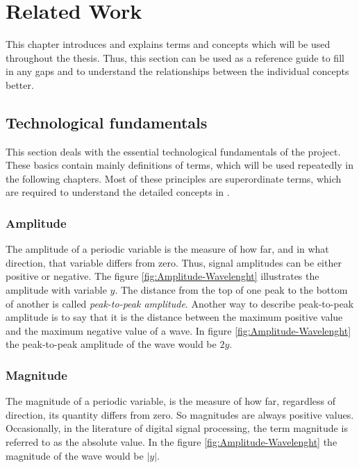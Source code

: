 \chapter{Related Work}
\label{ch:Related-Work}

This chapter introduces and explains terms and concepts which will be used throughout the thesis. Thus, this section can be used as a reference guide to fill in any gaps and to understand the relationships between the individual concepts better.

\section{Technological fundamentals}
\label{sec:Technological-Fundamentatls}

This section deals with the essential technological fundamentals of the project. These basics contain mainly definitions of terms, which will be used repeatedly in the following chapters. Most of these principles are superordinate terms, which are required to understand the detailed concepts in .

\subsection{Amplitude}
\label{sub:Amplitude}

The amplitude of a periodic variable is the measure of how far, and in what direction, that variable differs from zero. Thus, signal amplitudes can be either positive or negative. The figure \ref{fig:Amplitude-Wavelenght} illustrates the amplitude with variable $y$. 
\newline
\newline
The distance from the top of one peak to the bottom of another is called \textit{peak-to-peak amplitude}. Another way to describe peak-to-peak amplitude is to say that it is the distance between the maximum positive value and the maximum negative value of a wave. In figure \ref{fig:Amplitude-Wavelenght} the peak-to-peak amplitude of the wave would be $2y$.

\subsection{Magnitude}
\label{sub:Magnitude}

The magnitude of a periodic variable, is the measure of how far, regardless of direction, its quantity differs from zero. So magnitudes are always positive values. Occasionally, in the literature of digital signal processing, the term magnitude is referred to as the absolute value. In the figure \ref{fig:Amplitude-Wavelenght} the magnitude of the wave would be $|y|$.

